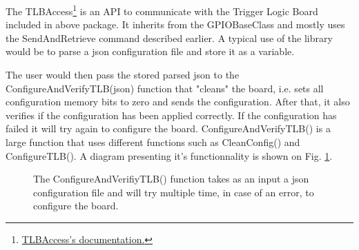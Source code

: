 The TLBAccess\footnote{\href{https://faserdaq.web.cern.ch/faserdaq/gpiodrivers/doc/html/class_f_a_s_e_r_1_1_t_l_b_access.html\#ada95a891d48b8d907e49e51ec3a6d5de}{TLBAccess's documentation.}} is an API to communicate with the Trigger Logic Board included in above package. It inherits from the GPIOBaseClass and mostly uses the SendAndRetrieve command described earlier. A typical use of the library would be to parse a json configuration file and store it as a variable.



The user would then pass the stored parsed json to the ConfigureAndVerifyTLB(json) function that "cleans" the board, i.e. sets all configuration memory bits to zero and sends the configuration. After that, it also verifies if the configuration has been applied correctly. If the configuration has failed it will try again to configure the board. ConfigureAndVerifyTLB() is a large function that uses different functions such as CleanConfig() and ConfigureTLB(). A diagram presenting it's functionnality is shown on Fig. \ref{fig:ConfigureAndVerifyTLB()}.

\begin{figure}[htbp!]
    \centering
    \caption{The ConfigureAndVerifiyTLB() function takes as an input a json configuration file and  will try multiple time, in case of an error, to configure the board.}
    \label{fig:ConfigureAndVerifyTLB()}
\end{figure}


